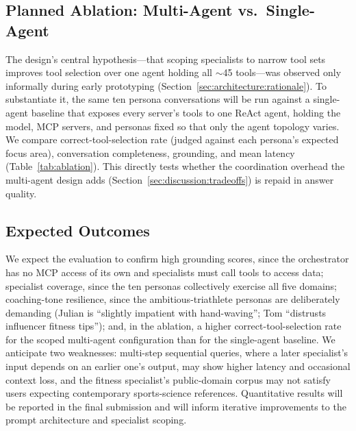 
\FloatBarrier

\subsection{Planned Ablation: Multi-Agent vs.\ Single-Agent}\label{sec:evaluation:ablation}

The design's central hypothesis---that scoping specialists to narrow tool sets improves tool selection over one agent holding all $\sim$45 tools---was observed only informally during early prototyping (Section~\ref{sec:architecture:rationale}). To substantiate it, the same ten persona conversations will be run against a single-agent baseline that exposes every server's tools to one ReAct agent, holding the model, MCP servers, and personas fixed so that only the agent topology varies. We compare correct-tool-selection rate (judged against each persona's expected focus area), conversation completeness, grounding, and mean latency (Table~\ref{tab:ablation}). This directly tests whether the coordination overhead the multi-agent design adds (Section~\ref{sec:discussion:tradeoffs}) is repaid in answer quality.


\FloatBarrier

\subsection{Expected Outcomes}\label{sec:evaluation:expected}

We expect the evaluation to confirm high grounding scores, since the orchestrator has no MCP access of its own and specialists must call tools to access data; specialist coverage, since the ten personas collectively exercise all five domains; coaching-tone resilience, since the ambitious-triathlete personas are deliberately demanding (Julian is ``slightly impatient with hand-waving''; Tom ``distrusts influencer fitness tips''); and, in the ablation, a higher correct-tool-selection rate for the scoped multi-agent configuration than for the single-agent baseline. We anticipate two weaknesses: multi-step sequential queries, where a later specialist's input depends on an earlier one's output, may show higher latency and occasional context loss, and the fitness specialist's public-domain corpus may not satisfy users expecting contemporary sports-science references. Quantitative results will be reported in the final submission and will inform iterative improvements to the prompt architecture and specialist scoping.
